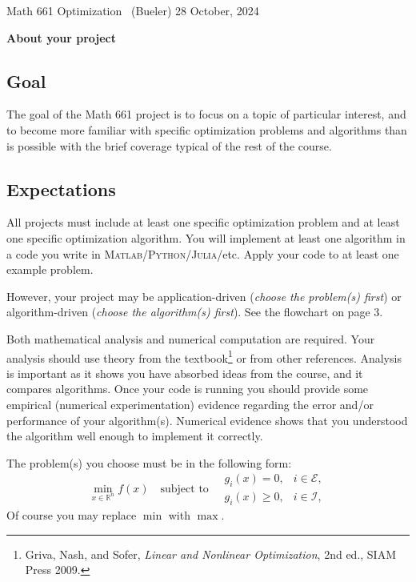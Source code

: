 \documentclass[12pt]{amsart}
\newcommand{\normalspacing}{\renewcommand{\baselinestretch}{1.05}
        \tiny\normalsize}
\newcommand{\RR}{\mathbb{R}}
\newcommand{\Matlab}{\textsc{Matlab}\xspace}
\newcommand{\Python}{\textsc{Python}\xspace}
\newcommand{\Julia}{\textsc{Julia}\xspace}
\begin{document}
\scriptsize \noindent Math 661 Optimization \, (Bueler) \hfill  28 October, 2024
\normalsize\bigskip
\normalspacing

\Large\centerline{\textbf{About your project}}
\normalsize

\bigskip\medskip
\thispagestyle{empty}
\normalspacing

\subsection*{Goal}  The goal of the Math 661 project is to focus on a topic of particular interest, and to become more familiar with specific optimization problems and algorithms than is possible with the brief coverage typical of the rest of the course.

\subsection*{Expectations}  All projects must include at least one specific optimization problem and at least one specific optimization algorithm.  You will implement at least one algorithm in a code you write in \Matlab/\Python/\Julia/etc.  Apply your code to at least one example problem.

However, your project may be application-driven (\emph{choose the problem(s) first}) or algorithm-driven (\emph{choose the algorithm(s) first}).  See the flowchart on page 3.

Both mathematical analysis and numerical computation are required.  Your analysis should use theory from the textbook\footnote{Griva, Nash, and Sofer, \emph{Linear and Nonlinear Optimization}, 2nd ed., SIAM Press 2009.} or from other references.  Analysis is important as it shows you have absorbed ideas from the course, and it compares algorithms.  Once your code is running you should provide some empirical (numerical experimentation) evidence regarding the error and/or performance of your algorithm(s).  Numerical evidence shows that you understood the algorithm well enough to implement it correctly.

The problem(s) you choose must be in the following form:
\begin{equation}
\min_{x\in \RR^n} f(x) \quad \text{subject to} \quad \begin{matrix}
                                                      g_i(x) = 0, & i \in \mathcal{E}, \\
                                                      g_i(x) \ge 0, & i \in \mathcal{I},
                                                      \end{matrix}  \label{genform}
\end{equation}
Of course you may replace $\min$ with $\max$.
\end{document}

